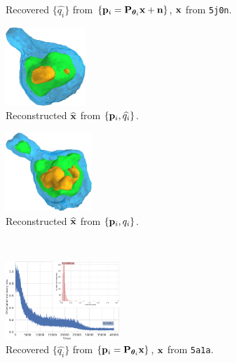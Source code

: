 \begin{figure}[t]
\begin{subfigure}[b]{0.44\linewidth}
        \caption{Recovered $\{ \widehat{q_i} \}$ from $\{ \mathbf{p}_i = \mathbf{P}_{{\boldsymbol{\theta}}_i} \mathbf{x} + \mathbf{n} \}$, $\mathbf{x}$ from \texttt{5j0n}.}%
        \label{fig:5j0n-noise16-orientation-recovery}
    \end{subfigure}
    \hfill
    \begin{subfigure}[b]{0.26\linewidth}
        \centering
        \includegraphics[height=8em]{figures/5j0n_reconstruction_noise16}
        \caption{Reconstructed $\widehat{\mathbf{x}}$ from $\{ \mathbf{p}_i, \widehat{q_i} \}$.}%
        \label{fig:5j0n-noise16-reconstruction-recovered}
    \end{subfigure}
    \hfill
    \begin{subfigure}[b]{0.26\linewidth}
        \centering
        \includegraphics[height=8em]{figures/5j0n_reconstruction_GT_noise16}
        \caption{Reconstructed $\widehat{\mathbf{x}}$ from $\{ \mathbf{p}_i, q_i \}$.}%
        \label{fig:5j0n-noise16-reconstruction-true}
    \end{subfigure}
    \\ \vspace{1em}
    \begin{subfigure}[b]{0.44\linewidth}
        \centering
        \includegraphics[width=\linewidth,height=8em]{figures/5a1a_noise0_ar_aa}
        \caption{Recovered $\{ \widehat{q_i} \}$ from $\{ \mathbf{p}_i = \mathbf{P}_{{\boldsymbol{\theta}}_i} \mathbf{x} \}$, $\mathbf{x}$ from \texttt{5a1a}.}%
        \label{fig:5a1a-noise0-orientation-recovery}
    \end{subfigure}
    \hfill
    \begin{subfigure}[b]{0.26\linewidth}

\end{subfigure}
\end{figure}
